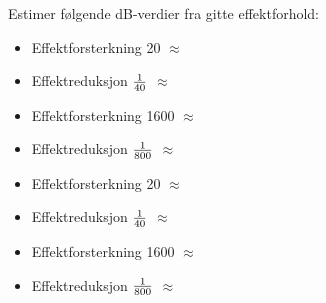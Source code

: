 \vskip 10pt

Estimer følgende dB-verdier fra gitte effektforhold:

\begin{itemize}
\item{} Effektforsterkning 20 $\approx$ \underbar{\hskip 50pt}
\vskip 5pt
\item{} Effektreduksjon $1 \over 40$ $\approx$ \underbar{\hskip 50pt} 
\vskip 5pt
\item{} Effektforsterkning 1600 $\approx$ \underbar{\hskip 50pt}
\vskip 5pt
\item{} Effektreduksjon $1 \over 800$ $\approx$ \underbar{\hskip 50pt} 
\vskip 5pt
\end{itemize}







\begin{itemize}
\item{} Effektforsterkning 20 $\approx$ 
\vskip 5pt
\item{} Effektreduksjon $1 \over 40$ $\approx$  
\vskip 5pt
\item{} Effektforsterkning 1600 $\approx$ 
\vskip 5pt
\item{} Effektreduksjon $1 \over 800$ $\approx$  
\vskip 5pt
\end{itemize}










